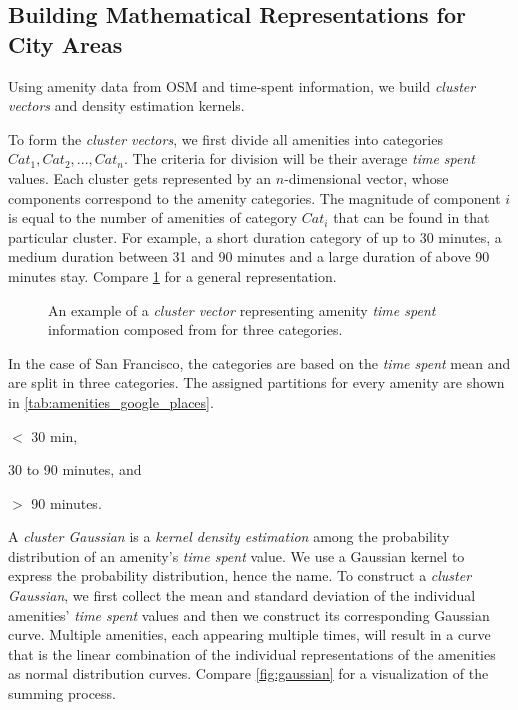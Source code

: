 	\subsection{Building Mathematical Representations for City Areas}
	Using amenity data from OSM and time-spent information, we build \textit{cluster vectors} and density estimation kernels.
	
	To form the \textit{cluster vectors}, we first divide all amenities into categories $Cat_1, Cat_2, ..., Cat_n$. The criteria for division will be their average \textit{time spent} values. Each cluster gets represented by an $n$-dimensional vector, whose components correspond to the amenity categories. The magnitude of component $i$ is equal to the number of amenities of category $Cat_i$ that can be found in that particular cluster. For example, a short duration category of up to 30 minutes, a medium duration between 31 and 90 minutes and a large duration of above 90 minutes stay. Compare \cref{fig:cluster_vector} for a general representation.
	
	\begin{figure}[!ht]
		\centering
		
		\caption{An example of a \textit{cluster vector} representing amenity \textit{time spent} information composed from for three categories.}
		\label{fig:cluster_vector}
	\end{figure}
	
	In the case of San Francisco, the categories are based on the \textit{time spent} mean and are split in three categories. The assigned partitions for every amenity are shown in \cref{tab:amenities_google_places}.
	\begin{romanlist}
		\item $<$ 30 min,
		\item 30 to 90 minutes, and
		\item $>$ 90 minutes. 
	\end{romanlist}
	
	A \textit{cluster Gaussian} is a \textit{kernel density estimation} among the probability distribution of an amenity's \textit{time spent} value. We use a Gaussian kernel to express the probability distribution, hence the name. To construct a \textit{cluster Gaussian}, we first collect the mean and standard deviation of the individual amenities' \textit{time spent} values and then we construct its corresponding Gaussian curve. Multiple amenities, each appearing multiple times, will result in a curve that is the linear combination of the individual representations of the amenities as normal distribution curves. Compare \cref{fig:gaussian} for a visualization of the summing process.
	

